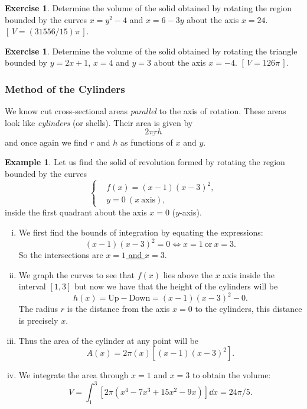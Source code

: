 \documentclass[12pt]{article}
\theoremstyle{plain}
\theoremstyle{definition}
\newtheorem{Ex}[Th]{Example}           %
\newtheorem{Ej}[Th]{Exercise}         %
\theoremstyle{remark}
\renewcommand{\:}{\colon}           %
\newcommand{\un}[1]{\underline{#1}}
\renewcommand{\.}{\Cdot}                %
\newcommand{\bonj}[1]{\left\lbrack\,#1\,\right\rbrack}
\begin{document}
\begin{multicols}{2}
  \begin{Ej}
    Determine the volume of the solid obtained by rotating the region bounded by the curves $x=y^2-4$ and $x=6-3y$ about the axis $x=24$. $\bonj{V=(31556/15)\pi}$.
    \end{Ej}

    \begin{Ej}
      Determine the volume of the solid obtained by rotating the triangle bounded by $y=2x+1$, $x=4$ and $y=3$ about the axis $x=-4$. $\bonj{V=126\pi}$.
      \end{Ej}
\newpage
\subsubsection*{Method of the Cylinders}

We know cut cross-sectional areas \emph{parallel} to the axis of rotation. These areas look like \emph{cylinders} (or shells). Their area is given by 
$$\un{2\pi r h}$$
and once again we find $r$ and $h$ as functions of $x$ and $y$.

\begin{Ex}
  Let us find the solid of revolution formed by rotating the region bounded by the curves
  $$
\left\lbrace
\begin{aligned}
  &f(x)=(x-1)(x-3)^2,\\
  &y=0\ (x\ \text{axis}),
\end{aligned}
\right.
$$
inside the first quadrant about the axis $x=0$ ($y$-axis).
\begin{enumerate}[i)]
  \itemsep=-0.4em
  \item We first find the bounds of integration by equating the expressions: 
  $$(x-1)(x-3)^2=0\iff x=1\ \text{or}\ x=3.$$
  So the intersections are \un{$x=1$ and $x=3$}.
  \item We graph the curves to see that $f(x)$ lies above the $x$ axis inside the interval $[1,3]$ but now we have that the height of the cylinders will be 
  $$h(x)=\text{Up}-\text{Down}=(x-1)(x-3)^2-0.$$
  The radius $r$ is the distance from the axis $x=0$ to the cylinders, this distance is precisely $x$.
  \item Thus the area of the cylinder at any point will be 
  $$A(x)=2\pi(x)[(x-1)(x-3)^2].$$
  \item We integrate the area through $x=1$ and $x=3$ to obtain the volume: 
  $$V=\int_1^3[2\pi(x^4-7x^3+15x^2-9x)]\dd x=24\pi/5.$$
\end{enumerate}
\end{Ex}


\end{multicols}
\end{document}
